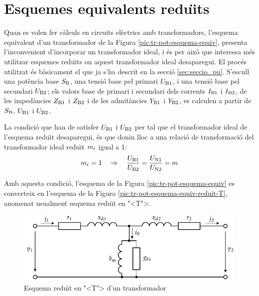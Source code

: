 \section{Esquemes equivalents redu\"{\i}ts}

Quan es volen fer c\`{a}lculs en circuits el\`{e}ctrics amb transformadors, l'esquema equivalent d'un transformador de la Figura  \vref{pic:tr-pot-esquema-equiv}, presenta l'inconvenient d'incorporar un transformador ideal, i \'{e}s per aix\`{o} que interessa m\'{e}s utilitzar esquemes redu\"{\i}ts on aquest transformador ideal desaparegui.
El proc\'{e}s utilitzat \'{e}s b\`{a}sicament el que ja s'ha descrit en la secci\'{o} \vref{sec:seccio_pu}. S'escull una pot\`{e}ncia base $S_\mathrm{B}$, una tensi\'{o} base pel primari $U_\mathrm{B1}$, i una tensi\'{o} base pel secundari $U_\mathrm{B2}$; els valors base de primari i secundari dels corrents $I_\mathrm{B1}$ i $I_\mathrm{B2}$, de les imped\`{a}ncies $Z_\mathrm{B1}$ i $Z_\mathrm{B2}$ i de les admit\`{a}ncies $Y_\mathrm{B1}$ i $Y_\mathrm{B2}$, es calculen a partir de $S_\mathrm{B}$, $U_\mathrm{B1}$ i $U_\mathrm{B2}$.

La condici\'{o} que han de satisfer $U_\mathrm{B1}$ i $U_\mathrm{B2}$ per tal que el transformador ideal de l'esquema redu\"{\i}t desaparegui, \'{e}s que donin lloc a una relaci\'{o} de transformaci\'{o} del transformador ideal redu\"{\i}t $m_\mathrm{r}$ igual a  1:
\begin{equation}\label{eq:mr}
    m_\mathrm{r} = 1 \quad \Rightarrow \quad \frac{U_\mathrm{B1}}{U_\mathrm{B2}} = \frac{U_\mathrm{N1}}{U_\mathrm{N2}} = m
\end{equation}

 Amb aquesta condici\'{o}, l'esquema de la Figura \vref{pic:tr-pot-esquema-equiv} es converteix en l'esquema de la Figura
\vref{pic:tr-pot-esquema-equiv-reduit-T}, anomenat usualment esquema redu\"{\i}t en {"<}T{">}.

\begin{figure}[htb]
\centering
    \includegraphics{Imatges/Cap-TrafosPot-Esq-Equiv-Reduit-T.pdf}
\caption{Esquema redu\"{\i}t en {"<}T{">} d'un transformador}
\label{pic:tr-pot-esquema-equiv-reduit-T}
\end{figure}

